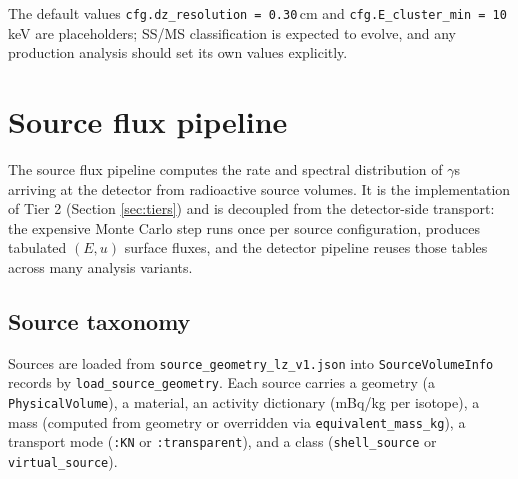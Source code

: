 \documentclass[11pt]{article}
\begin{document}
The default values \texttt{cfg.dz\_resolution = 0.30}\,cm and
\texttt{cfg.E\_cluster\_min = 10}\,keV are placeholders; SS/MS classification
is expected to evolve, and any production analysis should set its own
values explicitly.

\section{Source flux pipeline}
\label{sec:source-pipeline}

The source flux pipeline computes the rate and spectral distribution of
$\gamma$s arriving at the detector from radioactive source volumes. It is
the implementation of Tier 2 (Section \ref{sec:tiers}) and is decoupled from
the detector-side transport: the expensive Monte Carlo step runs once per
source configuration, produces tabulated $(E, u)$ surface fluxes, and the
detector pipeline reuses those tables across many analysis variants.

\subsection{Source taxonomy}
\label{sec:source-taxonomy}

Sources are loaded from \texttt{source\_geometry\_lz\_v1.json} into
\texttt{SourceVolumeInfo} records by \texttt{load\_source\_geometry}. Each
source carries a geometry (a \texttt{PhysicalVolume}), a material, an
activity dictionary (mBq/kg per isotope), a mass (computed from geometry or
overridden via \texttt{equivalent\_mass\_kg}), a transport mode
(\texttt{:KN} or \texttt{:transparent}), and a class
(\texttt{shell\_source} or \texttt{virtual\_source}).
\end{document}
